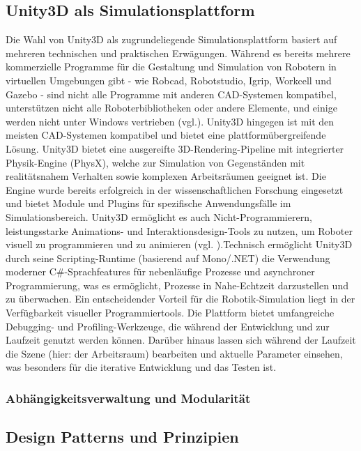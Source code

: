 \subsection{Unity3D als Simulationsplattform}
Die Wahl von Unity3D als zugrundeliegende Simulationsplattform basiert auf
mehreren technischen und praktischen Erwägungen. Während es bereits mehrere
kommerzielle Programme für die Gestaltung und Simulation von Robotern in
virtuellen Umgebungen gibt - wie Robcad, Robotstudio, Igrip, Workcell und
Gazebo - sind nicht alle Programme mit anderen CAD-Systemen kompatibel,
unterstützen nicht alle Roboterbibliotheken oder andere Elemente, und einige
werden nicht unter Windows vertrieben (vgl.\cite{andaluz:16}). Unity3D hingegen
ist mit den meisten CAD-Systemen kompatibel und bietet eine
plattformübergreifende Lösung. Unity3D bietet eine ausgereifte
3D-Rendering-Pipeline mit integrierter Physik-Engine (PhysX), welche zur
Simulation von Gegenständen mit realitätsnahem Verhalten sowie komplexen
Arbeitsräumen geeignet ist. Die Engine wurde bereits erfolgreich in der
wissenschaftlichen Forschung eingesetzt und bietet Module und Plugins für
spezifische Anwendungsfälle im Simulationsbereich. Unity3D ermöglicht es auch
Nicht-Programmierern, leistungsstarke Animations- und Interaktionsdesign-Tools
zu nutzen, um Roboter visuell zu programmieren und zu animieren (vgl.
\cite{bartneck:15}).\newline Technisch ermöglicht Unity3D durch seine
Scripting-Runtime (basierend auf Mono/.NET) die Verwendung moderner
C\#-Sprachfeatures für nebenläufige Prozesse und asynchroner Programmierung,
was es ermöglicht, Prozesse in Nahe-Echtzeit darzustellen und zu überwachen.
Ein entscheidender Vorteil für die Robotik-Simulation liegt in der
Verfügbarkeit visueller Programmiertools. Die Plattform bietet umfangreiche
Debugging- und Profiling-Werkzeuge, die während der Entwicklung und zur
Laufzeit genutzt werden können. Darüber hinaus lassen sich während der Laufzeit
die Szene (hier: der Arbeitsraum) bearbeiten und aktuelle Parameter einsehen,
was besonders für die iterative Entwicklung und das Testen ist.

\subsubsection{Abhängigkeitsverwaltung und Modularität}

\subsection{Design Patterns und Prinzipien}

